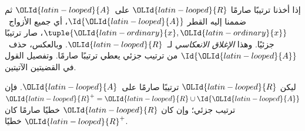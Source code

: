\documentclass[../../../include/open-logic-section]{subfiles}
\begin{document}
إذا أخذنا ترتيبًا صارمًا $\OLId{latin-looped}{R}$ على~$\OLId{latin-looped}{A}$ ثم ضممنا إليه القطر $\Id{\OLId{latin-looped}{A}}$،
أي جميع الأزواج~$\tuple{\OLId{latin-ordinary}{x}, \OLId{latin-ordinary}{x}}$، صار ترتيبًا جزئيًا. وهذا
\emph{الإغلاق الانعكاسي} لـ~$\OLId{latin-looped}{R}$. وبالعكس، حذف~$\Id{\OLId{latin-looped}{A}}$ من ترتيب
جزئي يعطي ترتيبًا صارمًا. وتفصيل القول في القضيتين الآتيتين.

\begin{prop}
ليكن $\OLId{latin-looped}{R}$ ترتيبًا صارمًا على~$\OLId{latin-looped}{A}$. فإن $\OLId{latin-looped}{R}^+ = \OLId{latin-looped}{R} \cup \Id{\OLId{latin-looped}{A}}$ ترتيب
جزئي؛ وإن كان $\OLId{latin-looped}{R}$ خطيًا صارمًا كان $\OLId{latin-looped}{R}^+$ خطيًا.
\end{prop}
\end{document}
